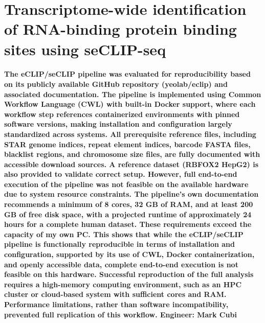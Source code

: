 \documentclass{article}
\begin{document}
\section{Transcriptome-wide identification of RNA-binding protein binding sites using seCLIP-seq \cite{Blue2022}}

\paragraph{
    The eCLIP/seCLIP pipeline was evaluated for reproducibility based on its publicly available GitHub repository (yeolab/eclip) and associated documentation. The pipeline is implemented using Common Workflow Language (CWL) with built-in Docker support, where each workflow step references containerized environments with pinned software versions, making installation and configuration largely standardized across systems. All prerequisite reference files, including STAR genome indices, repeat element indices, barcode FASTA files, blacklist regions, and chromosome size files, are fully documented with accessible download sources. A reference dataset (RBFOX2 HepG2) is also provided to validate correct setup. However, full end-to-end execution of the pipeline was not feasible on the available hardware due to system resource constraints. The pipeline's own documentation recommends a minimum of 8 cores, 32 GB of RAM, and at least 200 GB of free disk space, with a projected runtime of approximately 24 hours for a complete human dataset. These requirements exceed the capacity of my own PC. This shows that while the eCLIP/seCLIP pipeline is functionally reproducible in terms of installation and configuration, supported by its use of CWL, Docker containerization, and openly accessible data, complete end-to-end execution is not feasible on this hardware. Successful reproduction of the full analysis requires a high-memory computing environment, such as an HPC cluster or cloud-based system with sufficient cores and RAM. Performance limitations, rather than software incompatibility, prevented full replication of this workflow. Engineer: Mark Cubi
}



\end{document}
